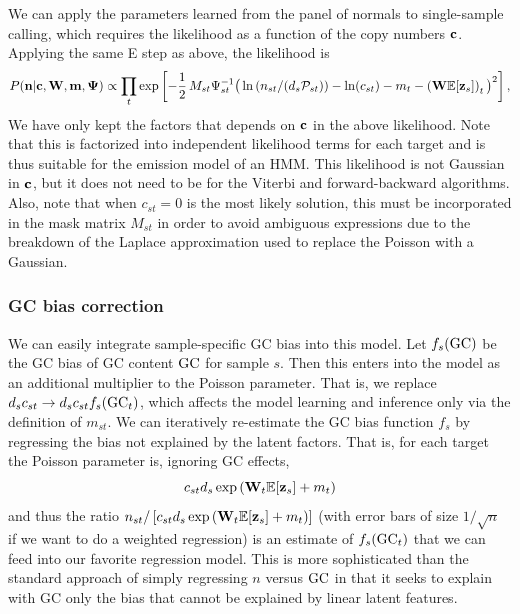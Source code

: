 \documentclass[nofootinbib,amssymb,amsmath]{revtex4}
\newcommand{\vc}{{\bf c}}
\newcommand{\vz}{{\bf z}}
\newcommand{\vn}{{\bf n}}
\newcommand{\vm}{{\bf m}}
\newcommand{\vW}{{\bf W}}
\newcommand{\vPsi}{{\bf \Psi}}
\newcommand{\PP}{\mathcal{P}}
\newcommand{\EE}{\mathbb{E}}
\begin{document}
We can apply the parameters learned from the panel of normals to single-sample calling, which requires the likelihood as a function of the copy numbers $\vc$.  Applying the same E step as above, the likelihood is
\begin{equation}
P(\vn | \vc, \vW, \vm, \vPsi) \propto \prod_t \exp \left[ -\frac{1}{2} \, M_{st} \Psi_{st}^{-1} \big( \ln \left( n_{st} / (d_s \PP_{st}) \right) - \ln(c_{st}) - m_t - \left(\vW \EE[\vz_{s}]\right)_t \big)^2 \right],
\end{equation}
We have only kept the factors that depends on $\vc$ in the above likelihood. Note that this is factorized into independent likelihood terms for each target and is thus suitable for the emission model of an HMM.  This likelihood is not Gaussian in $\vc$, but it does not need to be for the Viterbi and forward-backward algorithms. Also, note that when $c_{st} = 0$ is the most likely solution, this must be incorporated in the mask matrix $M_{st}$ in order to avoid ambiguous expressions due to the breakdown of the Laplace approximation used to replace the Poisson with a Gaussian.\\

\subsubsection{GC bias correction}
We can easily integrate sample-specific GC bias into this model.  Let $f_s({\rm GC})$ be the GC bias of GC content ${\rm GC}$ for sample $s$.  Then this enters into the model as an additional multiplier to the Poisson parameter.  That is, we replace $d_s c_{st} \rightarrow d_s c_{st} f_s({\rm GC}_t)$, which affects the model learning and inference only via the definition of $m_{st}$.  We can iteratively re-estimate the GC bias function $f_s$ by regressing the bias not explained by the latent factors.  That is, for each target the Poisson parameter is, ignoring GC effects,
\begin{equation}
c_{st} d_s \exp \left( \vW_t \EE[\vz_s] + m_t \right)
\end{equation}
and thus the ratio $n_{st} / \left[ c_{st} d_s \exp \left( \vW_t \EE[\vz_s] + m_t \right) \right]$ (with error bars of size $1/\sqrt{n}$ if we want to do a weighted regression) is an estimate of $f_s({\rm GC}_t)$ that we can feed into our favorite regression model.  This is more sophisticated than the standard approach of simply regressing $n$ versus ${\rm GC}$ in that it seeks to explain with GC only the bias that cannot be explained by linear latent features.
\end{document}
